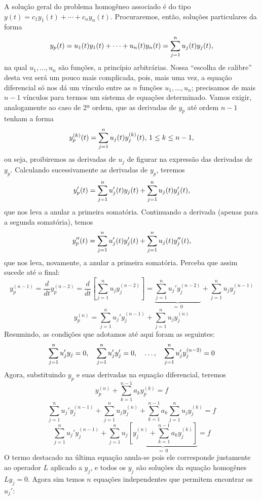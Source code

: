 \documentclass[12pt,a4paper,oneside]{memoir}
\begin{document}
A solução geral do problema homogêneo associado é do tipo $y(t) = c_1 y_1(t) + \cdots + c_n y_n(t)$.  Procuraremos, então, soluções particulares da forma
\begin{equation}
  y_p(t) = u_1(t) y_1(t) + \cdots + u_n(t) y_n(t) = \sum_{j=1}^{n} u_j(t) y_j(t) \text,
\end{equation}
na qual $u_1, \ldots, u_n$ são funções, a princípio arbitrárias.  Nossa ``escolha de calibre'' desta vez será um pouco mais complicada, pois, mais uma vez, a equação diferencial só nos dá um vínculo entre as $n$ funções $u_1, \ldots, u_n$; precisamos de mais $n-1$ vínculos para termos um sistema de equações determinado.  Vamos exigir, analogamente ao caso de 2ª ordem, que as derivadas de $y_p$ até ordem $n-1$ tenham a forma
\begin{equation}
\label{mvpn-vinc}
  y_p^{(k)}(t) = \sum_{j=1}^{n} u_j(t) y_j^{(k)}(t) \text{, } 1 \le k \le n-1 \text,
\end{equation}
ou seja, proibiremos as derivadas de $u_j$ de figurar na expressão das derivadas de $y_p$.  Calculando sucessivamente as derivadas de $y_p$, teremos
\[
  y_p'(t) = \sum_{j=1}^{n} u_j'(t) y_j(t) + \sum_{j=1}^{n} u_j(t) y_j'(t) \text,
\]
que nos leva a anular a primeira somatória.  Continuando a derivada (apenas para a segunda somatória), temos
\[
  y_p''(t) = \sum_{j=1}^{n} u_j'(t) y_j'(t) + \sum_{j=1}^{n} u_j(t) y_j''(t) \text,
\]
que nos leva, novamente, a anular a primeira somatória.  Perceba que assim sucede até o final:
\[
  y_p^{(n-1)}
    = \frac{d}{dt} y_p^{(n-2)}
    = \frac{d}{dt} \left[ \sum_{j=1}^{n} u_j y_j^{(n-2)} \right]
    = \underbrace{\sum_{j=1}^{n} u_j' y_j^{(n-2)}}_{=\:0}
      + \sum_{j=1}^{n} u_j y_j^{(n-1)}
\]
\begin{equation}
\label{mvpn-ypn}
  y_p^{(n)} = \sum_{j=1}^{n} u_j' y_j^{(n-1)} + \sum_{j=1}^{n} u_j y_j^{(n)}
\end{equation}
Resumindo, as condições que adotamos até aqui foram as seguintes:
\[
  \sum_{j=1}^{n} u_j' y_j = 0 \text,\quad
  \sum_{j=1}^{n} u_j' y_j' = 0 \text,\quad
  \ldots\text,\quad
  \sum_{j=1}^{n} u_j' y^{(n-2)}_j = 0
\]
Agora, substituindo $y_p$ e suas derivadas na equação diferencial, teremos
\[
  y_p^{(n)} + \sum_{k=1}^{n-1} a_k y_p^{(k)} = f \]
\[
  \sum_{j=1}^{n} u_j' y_j^{(n-1)}
  + \sum_{j=1}^{n} u_j y_j^{(n)}
  + \sum_{k=1}^{n-1} a_k \sum_{j=1}^{n} u_j y_j^{(k)} = f \]
\[
  \sum_{j=1}^{n} u_j' y_j^{(n-1)}
  + \sum_{j=1}^{n} u_j \underbrace{\left[
      y_j^{(n)}
      + \sum_{k=1}^{n-1} a_k y_j^{(k)}
    \right]}_{=\:0} = f
\]
O termo destacado na última equação anula-se pois ele corresponde justamente ao operador $L$ aplicado a $y_j$, e todos os $y_j$ são soluções da equação homogênes $Ly_j = 0$.  Agora sim temos $n$ equações independentes que permitem encontrar os $u_j'$:
\end{document}
